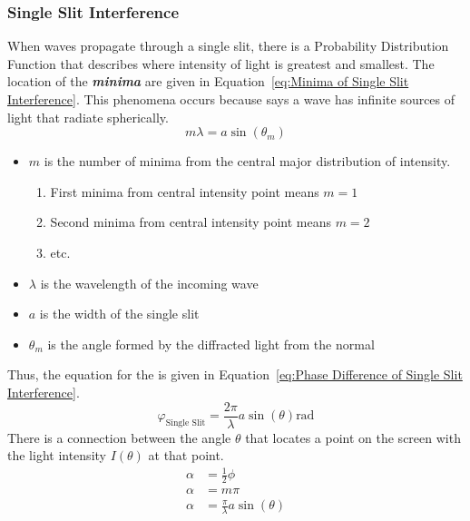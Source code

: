 		\subsubsection{Single Slit Interference} \label{subsubsec:Single Slit Interference}
			\begin{definition} \label{def:Single Slit Interference}
				When waves propagate through a single slit, there is a Probability Distribution Function that describes where intensity of light is greatest and smallest.
				The location of the \emph{\textbf{minima}} are given in Equation~\eqref{eq:Minima of Single Slit Interference}.
				This phenomena occurs because  says a wave has infinite sources of light that radiate spherically.
				\begin{equation} \label{eq:Minima of Single Slit Interference}
					m \lambda = a \sin \left( \theta_{m} \right)
				\end{equation}
				\begin{itemize}
					\item $m$ is the number of minima from the central major distribution of intensity.
					\begin{enumerate}
						\item First minima from central intensity point means $m=1$
						\item Second minima from central intensity point means $m=2$
						\item etc.
					\end{enumerate}
					\item $\lambda$ is the wavelength of the incoming wave
					\item $a$ is the width of the single slit
					\item $\theta_{m}$ is the angle formed by the diffracted light from the normal
				\end{itemize}
				Thus, the equation for the  is given in Equation~\eqref{eq:Phase Difference of Single Slit Interference}.
				\begin{equation} \label{eq:Phase Difference of Single Slit Interference}
					\varphi_{\text{Single Slit}} = \frac{2 \pi}{\lambda} a \sin \left( \theta \right) \si{\radian}
				\end{equation}
				There is a connection between the angle $\theta$ that locates a point on the screen with the light intensity $I\left( \theta \right)$ at that point.
				\begin{equation} \label{eq:Alpha for Single Slit Interference}
					\begin{aligned}
						\alpha &= \frac{1}{2} \phi \\
						\alpha &= m \pi \\
						\alpha &= \frac{\pi}{\lambda} a\sin \left( \theta \right) \\
					\end{aligned}
				\end{equation}
			\end{definition}
		
